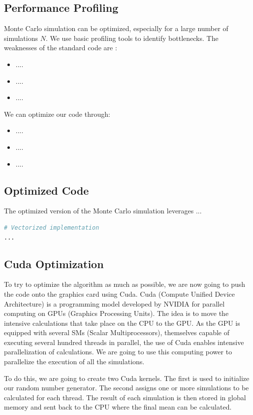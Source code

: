 \documentclass[12pt,a4paper]{report}
\begin{document}
\subsection{Performance Profiling}
Monte Carlo simulation can be optimized, especially for a large number of simulations \( N \). We use basic profiling tools to identify bottlenecks. The weaknesses of the standard code are :
\begin{itemize}
    \item ....
    \item ....
    \item ....
\end{itemize}
We can optimize our code through:
\begin{itemize}
    \item ....
    \item ....
    \item ....
\end{itemize}

\subsection{Optimized Code}
The optimized version of the Monte Carlo simulation leverages ...

\begin{lstlisting}[language=Python, caption={Optimized Monte Carlo Simulation}]
# Vectorized implementation
...
\end{lstlisting}

\subsection{Cuda Optimization}
To try to optimize the algorithm as much as possible, we are now going to push the code onto the graphics card using Cuda. Cuda (Compute Unified Device Architecture) is a programming model developed by NVIDIA for parallel computing on GPUs (Graphics Processing Units). The idea is to move the intensive calculations that take place on the CPU to the GPU. As the GPU is equipped with several SMs (Scalar Multiprocessors), themselves capable of executing several hundred threads in parallel, the use of Cuda enables intensive parallelization of calculations. We are going to use this computing power to parallelize the execution of all the simulations. 

To do this, we are going to create two Cuda kernels. The first is used to initialize our random number generator. The second assigns one or more simulations to be calculated for each thread. The result of each simulation is then stored in global memory and sent back to the CPU where the final mean can be calculated. 
\end{document}
